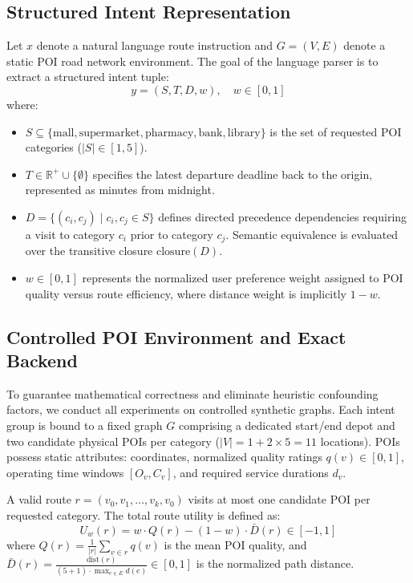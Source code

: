 \documentclass[conference]{IEEEtran}
\begin{document}
\subsection{Structured Intent Representation}
Let $x$ denote a natural language route instruction and $G = (V, E)$ denote a static POI road network environment. The goal of the language parser is to extract a structured intent tuple:
\begin{equation}
y = (S, T, D, w), \quad w \in [0, 1]
\end{equation}
where:
\begin{itemize}
    \item $S \subseteq \{\text{mall}, \text{supermarket}, \text{pharmacy}, \text{bank}, \text{library}\}$ is the set of requested POI categories ($|S| \in [1, 5]$).
    \item $T \in \mathbb{R}^+ \cup \{\emptyset\}$ specifies the latest departure deadline back to the origin, represented as minutes from midnight.
    \item $D = \{(c_i, c_j) \mid c_i, c_j \in S\}$ defines directed precedence dependencies requiring a visit to category $c_i$ prior to category $c_j$. Semantic equivalence is evaluated over the transitive closure $\text{closure}(D)$.
    \item $w \in [0, 1]$ represents the normalized user preference weight assigned to POI quality versus route efficiency, where distance weight is implicitly $1 - w$.
\end{itemize}

\subsection{Controlled POI Environment and Exact Backend}
To guarantee mathematical correctness and eliminate heuristic confounding factors, we conduct all experiments on controlled synthetic graphs. Each intent group is bound to a fixed graph $G$ comprising a dedicated start/end depot and two candidate physical POIs per category ($|V| = 1 + 2 \times 5 = 11$ locations). POIs possess static attributes: coordinates, normalized quality ratings $q(v) \in [0, 1]$, operating time windows $[O_v, C_v]$, and required service durations $d_v$.

A valid route $r = (v_0, v_1, \dots, v_k, v_0)$ visits at most one candidate POI per requested category. The total route utility is defined as:
\begin{equation}
U_w(r) = w \cdot Q(r) - (1 - w) \cdot \bar{D}(r) \in [-1, 1]
\end{equation}
where $Q(r) = \frac{1}{|r|} \sum_{v \in r} q(v)$ is the mean POI quality, and $\bar{D}(r) = \frac{\text{dist}(r)}{(5+1) \cdot \max_{e \in E} d(e)} \in [0, 1]$ is the normalized path distance.
\end{document}
